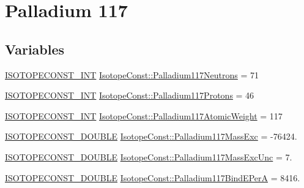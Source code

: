 \hypertarget{group___isotope_const-_palladium-_pd117}{}\section{Palladium 117}
\label{group___isotope_const-_palladium-_pd117}
\subsection*{Variables}
\begin{DoxyCompactItemize}
\item 
\mbox{\hyperlink{group___isotope_const-_macros_ga5f18360b3e99483a35c32d789e62621c}{I\+S\+O\+T\+O\+P\+E\+C\+O\+N\+S\+T\+\_\+\+I\+NT}} \mbox{\hyperlink{group___isotope_const-_palladium-_pd117_ga0394497ed992a09520652ba751bb47e7}{Isotope\+Const\+::\+Palladium117\+Neutrons}} = 71
\item 
\mbox{\hyperlink{group___isotope_const-_macros_ga5f18360b3e99483a35c32d789e62621c}{I\+S\+O\+T\+O\+P\+E\+C\+O\+N\+S\+T\+\_\+\+I\+NT}} \mbox{\hyperlink{group___isotope_const-_palladium-_pd117_gac19ed8e8c164188cd909b6a6df02a374}{Isotope\+Const\+::\+Palladium117\+Protons}} = 46
\item 
\mbox{\hyperlink{group___isotope_const-_macros_ga5f18360b3e99483a35c32d789e62621c}{I\+S\+O\+T\+O\+P\+E\+C\+O\+N\+S\+T\+\_\+\+I\+NT}} \mbox{\hyperlink{group___isotope_const-_palladium-_pd117_gab315c84c5b3818a8fc92fd563b60683c}{Isotope\+Const\+::\+Palladium117\+Atomic\+Weight}} = 117
\item 
\mbox{\hyperlink{group___isotope_const-_macros_ga8f45a7272ce02c0b4c65c44636ed719a}{I\+S\+O\+T\+O\+P\+E\+C\+O\+N\+S\+T\+\_\+\+D\+O\+U\+B\+LE}} \mbox{\hyperlink{group___isotope_const-_palladium-_pd117_gaec0fb16134f7fd0bb60e575cb08b19bd}{Isotope\+Const\+::\+Palladium117\+Mass\+Exc}} = -\/76424.
\item 
\mbox{\hyperlink{group___isotope_const-_macros_ga8f45a7272ce02c0b4c65c44636ed719a}{I\+S\+O\+T\+O\+P\+E\+C\+O\+N\+S\+T\+\_\+\+D\+O\+U\+B\+LE}} \mbox{\hyperlink{group___isotope_const-_palladium-_pd117_ga8e82933d95f0297c894fa8fab7170689}{Isotope\+Const\+::\+Palladium117\+Mass\+Exc\+Unc}} = 7.
\item 
\mbox{\hyperlink{group___isotope_const-_macros_ga8f45a7272ce02c0b4c65c44636ed719a}{I\+S\+O\+T\+O\+P\+E\+C\+O\+N\+S\+T\+\_\+\+D\+O\+U\+B\+LE}} \mbox{\hyperlink{group___isotope_const-_palladium-_pd117_gab7a25fb64f16f1b123eb31ad95896f20}{Isotope\+Const\+::\+Palladium117\+Bind\+E\+PerA}} = 8416.
\item 

\end{DoxyCompactItemize}
